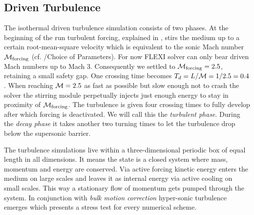 \subsection{Driven Turbulence}
\label{sec:stirturb}

The isothermal driven turbulence simulation consists of two phases. At the
beginning of the run turbulent forcing, explained in , stirs
the medium up to a certain root-mean-square velocity which is equivalent to the
sonic Mach number $\mathcal{M}_{\text{forcing}}$ (cf. /Choice
of Parameters). For now FLEXI solver can only bear driven Mach numbers up to
Mach 3. Consequently we settled to $\mathcal{M}_{\text{forcing}} = 2.5$, retaining a
small safety gap. One crossing time becomes $T_d = L/\mathcal{M} = 1/2.5 = 0.4$.
When reaching $\mathcal{M} = 2.5$ as fast as possible but slow enough not to crash
the solver the stirring module perpetually injects just enough energy to stay
in proximity of $\mathcal{M}_{\text{forcing}}$. The turbulence is given four crossing
times to fully develop after which forcing is deactivated. We will call this
the \emph{turbulent phase}. During the \emph{decay phase} it takes another two
turning times to let the turbulence drop below the supersonic barrier.

The turbulence simulations live within a three-dimensional periodic box of
equal length in all dimensions. It means the state is a closed system where
mass, momentum and energy are conserved. Via active forcing kinetic energy
enters the medium on large scales and leaves it as internal energy via active
cooling on small scales. This way a stationary flow of momentum gets pumped
through the system. In conjunction with \emph{bulk motion correction}
hyper-sonic turbulence emerges which presents a stress test for every numerical
scheme.

